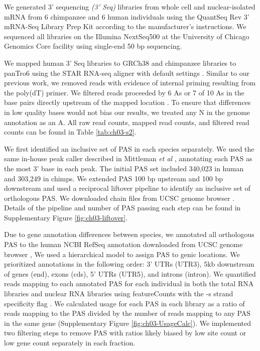 We generated 3' sequencing \emph{(3' Seq)} libraries from whole cell and nuclear-isolated mRNA from 6 chimpanzee and 6 human individuals using the QuantSeq Rev 3' mRNA-Seq Library Prep Kit \citep{moll_quantseq_2014} according to the manufacturer's instructions. We sequenced all libraries on the Illumina NextSeq500 at the University of Chicago Genomics Core facility using single-end 50 bp sequencing.

We mapped human 3' Seq libraries to GRCh38 \citep{schneider_evaluation_2017} and chimpanzee libraries to panTro6 \cite{chimpanzee_sequencing_and_analysis_consortium_initial_2005} using the STAR RNA-seq aligner with default settings \citep{dobin_star_2013}. Similar to our previous work, we removed reads with evidence of internal priming resulting from the poly(dT) primer. We filtered reads proceeded by 6 As or 7 of 10 As in the base pairs directly upstream of the mapped location 
\citep{mittleman_alternative_2020, sheppard_accurate_2013, tian_large-scale_2005}. To ensure that differences in low quality bases would not bias our results, we treated any N in the genome annotation as an A. All raw read counts, mapped read counts, and filtered read counts can be found in Table \ref{tab:ch03-s2}. 

We first identified an inclusive set of PAS in each species separately. We used the same in-house peak caller described in Mittleman \emph{et al} \citep{mittleman_alternative_2020}, annotating each PAS as the most 3' base in each peak. The initial PAS set included 340,023 in human and 303,249 in chimps. We extended PAS 100 bp upstream and 100 bp downstream and used a reciprocal liftover pipeline to identify an inclusive set of orthologous PAS. We downloaded chain files from UCSC genome browser \citep{kent_human_2002}. Details of the pipeline and number of PAS passing each step can be found in Supplementary Figure \ref{fig:ch03-liftover}.

Due to gene annotation differences between species, we annotated all orthologous PAS to the human NCBI RefSeq annotation downloaded from UCSC genome browser \citep{pruitt_ncbi_2005}, We used a hierarchical model to assign PAS to genic locations\citep{lin_-depth_2012, mittleman_alternative_2020}. We prioritized annotations in the following order: 3' UTRs (UTR3), 5kb downstream of genes (end), exons (cds), 5' UTRs (UTR5), and introns (intron). We quantified reads mapping to each annotated PAS for each individual in both the total RNA libraries and nuclear RNA libraries using featureCounts with the -s strand specificity flag \citep{liao_featurecounts_2014}. We calculated usage for each PAS in each library as a ratio of reads mapping to the PAS divided by the number of reads mapping to any PAS in the same gene (Supplementary Figure \ref{fig:ch03-UsageCalc}). We implemented two filtering steps to remove PAS with ratios likely biased by low site count or low gene count separately in each fraction.

